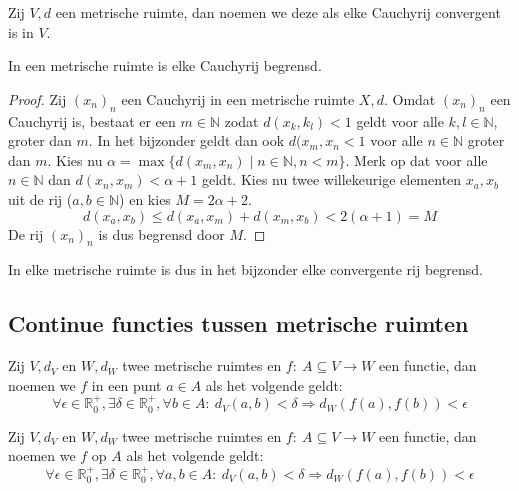 \documentclass[main.tex]{subfiles}
\begin{document}
\begin{de}
  \label{de:metrische-ruimte-volledig}
  Zij $V,d$ een metrische ruimte, dan noemen we deze  als elke Cauchyrij convergent is in $V$.
\end{de}

\begin{st}
  In een metrische ruimte is elke Cauchyrij begrensd.

  \begin{proof}
    Zij $(x_{n})_{n}$ een Cauchyrij in een metrische ruimte $X,d$.
    Omdat $(x_{n})_{n}$ een Cauchyrij is, bestaat er een $m\in \mathbb{N}$ zodat $d(x_{k},k_{l}) < 1$ geldt voor alle $k,l \in \mathbb{N}$, groter dan $m$.
    In het bijzonder geldt dan ook $d(x_{m},x_{n} < 1$ voor alle $n\in \mathbb{N}$ groter dan $m$.
    Kies nu $\alpha = \max\{ d(x_{m},x_{n}) \mid n\in \mathbb{N}, n < m \}$.
    Merk op dat voor alle $n\in \mathbb{N}$ dan $d(x_{n},x_{m}) < \alpha + 1$ geldt.
    Kies nu twee willekeurige elementen $x_{a},x_{b}$ uit de rij ($a,b\in \mathbb{N}$) en kies $M=2\alpha+2$.
    \[ d(x_{a},x_{b}) \le d(x_{a},x_{m}) + d(x_{m},x_{b}) < 2(\alpha+1) = M \]
    De rij $(x_{n})_{n}$ is dus begrensd door $M$.
  \end{proof}
\end{st}

\begin{gev}
  In elke metrische ruimte is dus in het bijzonder elke convergente rij begrensd.
\end{gev}

\subsection{Continue functies tussen metrische ruimten}
\label{sec:cont-funct-tuss}

\begin{de}
  Zij $V,d_{V}$ en $W,d_{W}$ twee metrische ruimtes en $f:\ A \subseteq V \rightarrow W$ een functie, dan noemen we $f$  in een punt $a\in A$ als het volgende geldt:
  \[ \forall \epsilon \in \mathbb{R}_{0}^{+}, \exists \delta \in \mathbb{R}_{0}^{+}, \forall b \in A:\ d_{V}(a,b)< \delta \Rightarrow d_{W}(f(a),f(b)) < \epsilon \]
\end{de}

\begin{de}
  Zij $V,d_{V}$ en $W,d_{W}$ twee metrische ruimtes en $f:\ A \subseteq V \rightarrow W$ een functie, dan noemen we $f$  op $A$ als het volgende geldt:
  \[ \forall \epsilon \in \mathbb{R}_{0}^{+}, \exists \delta \in \mathbb{R}_{0}^{+}, \forall a,b \in A:\ d_{V}(a,b)< \delta \Rightarrow d_{W}(f(a),f(b)) < \epsilon \]
\end{de}
\end{document}
